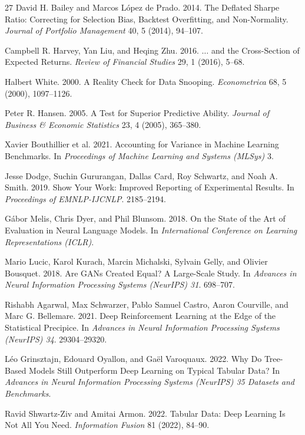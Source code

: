 \documentclass[sigconf,review]{acmart}
\begin{document}
\begin{thebibliography}{27}
David H. Bailey and Marcos L\'opez de Prado. 2014. The Deflated Sharpe Ratio: Correcting for Selection Bias, Backtest Overfitting, and Non-Normality. \textit{Journal of Portfolio Management} 40, 5 (2014), 94--107.

Campbell R. Harvey, Yan Liu, and Heqing Zhu. 2016. $\ldots$ and the Cross-Section of Expected Returns. \textit{Review of Financial Studies} 29, 1 (2016), 5--68.

Halbert White. 2000. A Reality Check for Data Snooping. \textit{Econometrica} 68, 5 (2000), 1097--1126.

Peter R. Hansen. 2005. A Test for Superior Predictive Ability. \textit{Journal of Business \& Economic Statistics} 23, 4 (2005), 365--380.

Xavier Bouthillier et al. 2021. Accounting for Variance in Machine Learning Benchmarks. In \textit{Proceedings of Machine Learning and Systems (MLSys)} 3.

Jesse Dodge, Suchin Gururangan, Dallas Card, Roy Schwartz, and Noah A. Smith. 2019. Show Your Work: Improved Reporting of Experimental Results. In \textit{Proceedings of EMNLP-IJCNLP}. 2185--2194.

G\'abor Melis, Chris Dyer, and Phil Blunsom. 2018. On the State of the Art of Evaluation in Neural Language Models. In \textit{International Conference on Learning Representations (ICLR)}.

Mario Lucic, Karol Kurach, Marcin Michalski, Sylvain Gelly, and Olivier Bousquet. 2018. Are GANs Created Equal? A Large-Scale Study. In \textit{Advances in Neural Information Processing Systems (NeurIPS) 31}. 698--707.

Rishabh Agarwal, Max Schwarzer, Pablo Samuel Castro, Aaron Courville, and Marc G. Bellemare. 2021. Deep Reinforcement Learning at the Edge of the Statistical Precipice. In \textit{Advances in Neural Information Processing Systems (NeurIPS) 34}. 29304--29320.

L\'eo Grinsztajn, Edouard Oyallon, and Ga\"el Varoquaux. 2022. Why Do Tree-Based Models Still Outperform Deep Learning on Typical Tabular Data? In \textit{Advances in Neural Information Processing Systems (NeurIPS) 35 Datasets and Benchmarks}.

Ravid Shwartz-Ziv and Amitai Armon. 2022. Tabular Data: Deep Learning Is Not All You Need. \textit{Information Fusion} 81 (2022), 84--90.


\end{thebibliography}
\end{document}
